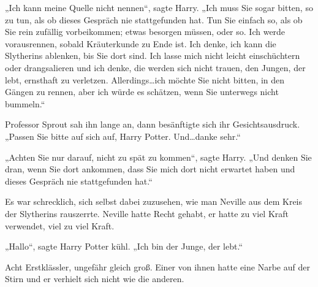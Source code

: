 „Ich kann meine Quelle nicht nennen“, sagte Harry. „Ich muss Sie sogar bitten, so zu tun, als ob dieses Gespräch nie stattgefunden hat. Tun Sie einfach so, als ob Sie rein zufällig vorbeikommen; etwas besorgen müssen, oder so. Ich werde vorausrennen, sobald Kräuterkunde zu Ende ist. Ich denke, ich kann die Slytherins ablenken, bis Sie dort sind. Ich lasse mich nicht leicht einschüchtern oder drangsalieren und ich denke, die werden sich nicht trauen, den Jungen, der lebt, ernsthaft zu verletzen. Allerdings…ich möchte Sie nicht bitten, in den Gängen zu rennen, aber ich würde es schätzen, wenn Sie unterwegs nicht bummeln.“

Professor Sprout sah ihn lange an, dann besänftigte sich ihr Gesichtsausdruck. „Passen Sie bitte auf sich auf, Harry Potter. Und…danke sehr.“

„Achten Sie nur darauf, nicht zu spät zu kommen“, sagte Harry. „Und denken Sie dran, wenn Sie dort ankommen, dass Sie mich dort nicht erwartet haben und dieses Gespräch nie stattgefunden hat.“

\later

Es war schrecklich, sich selbst dabei zuzusehen, wie man Neville aus dem Kreis der Slytherins rauszerrte. Neville hatte Recht gehabt, er hatte zu viel Kraft verwendet, viel zu viel Kraft.

„Hallo“, sagte Harry Potter kühl. „Ich bin der Junge, der lebt.“

Acht Erstklässler, ungefähr gleich groß. Einer von ihnen hatte eine Narbe auf der Stirn und er verhielt sich nicht wie die anderen.

